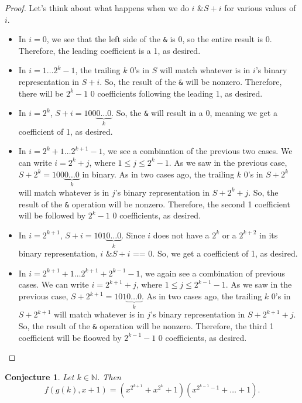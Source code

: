 \documentclass{article}
\newtheorem{conjecture}{Conjecture}
\newcommand{\N}{\mathbb{N}}
\begin{document}
\begin{proof}
		Let's think about what happens when we do $i \texttt{ \& } S + i$ for various values of $i$.
		\begin{itemize}
			\item
				In $i = 0$, we see that the left side of the \texttt{\&} is 0, so the entire result is 0. Therefore, the leading coefficient is a 1, as desired.
			\item
				In $i = 1 \dots 2^k - 1$, the trailing $k$ 0's in $S$ will match whatever is in $i$'s binary representation in $S + i$.
				So, the result of the \texttt{\&} will be nonzero.
				Therefore, there will be $2^k - 1$ 0 coefficients following the leading 1, as desired.
			\item
				In $i = 2^k$, $S + i = 100\underbrace{0 \dots 0}_{k}$.
				So, the \texttt{\&} will result in a 0, meaning we get a coefficient of 1, as desired.
			\item
				In $i = 2^k + 1 \dots 2^{k+1} - 1$, we see a combination of the previous two cases.
				We can write $i = 2^k + j$, where $1 \leq j \leq 2^{k} - 1$.
				As we saw in the previous case, $S + 2^k = 100\underbrace{0 \dots 0}_{k}$ in binary.
				As in two cases ago, the trailing $k$ 0's in $S + 2^k$ will match whatever is in $j$'s binary representation in $S + 2^k + j$.
				So, the result of the \texttt{\&} operation will be nonzero.
				Therefore, the second 1 coefficient will be followed by $2^k - 1$ 0 coefficients, as desired.
			\item
				In $i = 2^{k+1}$, $S + i = 101\underbrace{0 \dots 0}_{k}$.
				Since $i$ does not have a $2^k$ or a $2^{k+2}$ in its binary representation, $i \texttt{ \& } S+i \texttt{ == } 0$.
				So, we get a coefficient of 1, as desired.
			\item
				In $i = 2^{k+1} + 1 \dots 2^{k+1} + 2^{k-1} - 1$, we again see a combination of previous cases.
				We can write $i = 2^{k+1} + j$, where $1 \leq j \leq 2^{k-1} - 1$.
				As we saw in the previous case, $S + 2^{k+1} = 101\underbrace{0 \dots 0}_{k}$.
				As in two cases ago, the trailing $k$ 0's in $S + 2^{k+1}$ will match whatever is in $j$'s binary representation in $S + 2^{k+1} + j$.
				So, the result of the \texttt{\&} operation will be nonzero.
				Therefore, the third 1 coefficient will be floowed by $2^{k-1} - 1$ 0 coefficients, as desired.
		\end{itemize}	
	\end{proof}

	\begin{conjecture}
		\label{conj2}
		Let $k \in \N$.
		Then
		\begin{equation*}
			f(g(k), x+1) = \left(x^{2^{k+1}}+x^{2^k}+1\right)\left(x^{2^{k-1}-1}+\dots+1\right).
		\end{equation*}
	\end{conjecture}
	
\end{document}
